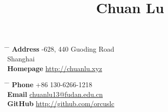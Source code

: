 \documentclass[10pt]{article} %
\begin{document}

\title{Chuan Lu} %


\parbox{0.5\textwidth}{ %
\begin{tabbing} %
\hspace{3cm} \= \hspace{4cm} \= \kill %
{\bf Address} -628, 440 Guoding Road\\ %
 Shanghai \\ %
{\bf Homepage} \> \href{http://chuanlu.xyz}{http://chuanlu.xyz} \\
\end{tabbing}}
\hfill %
\parbox{0.5\textwidth}{ %
\begin{tabbing} %
\hspace{3cm} \= \hspace{4cm} \= \kill %
{\bf Phone} \> +86 130-6266-1218 \\ %
{\bf Email} \> \href{mailto:chuanlu13@fudan.edu.cn}{chuanlu13@fudan.edu.cn} \\ %
{\bf GitHub} \> \href{http://github.com/orcuslc}{http://github.com/orcuslc}
\end{tabbing}}



\end{document}
